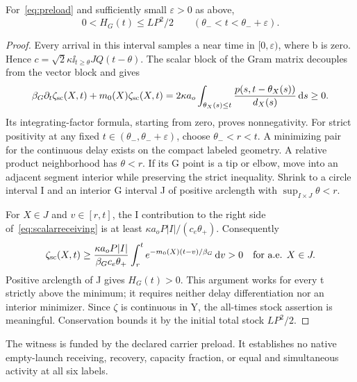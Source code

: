 \begin{proposition}\label{prop:receiving}
For~\eqref{eq:preload} and sufficiently small $\varepsilon>0$ as above,
\begin{equation}\label{eq:strictreceiving}
0<H_G(t)\le LP^2/2\qquad
(\theta_-<t<\theta_-+\varepsilon).
\end{equation}
\end{proposition}
\begin{proof}
Every arrival in this interval samples a near time in $[0,\varepsilon)$, where b is zero. Hence $c=\sqrt2\kappa\ii_{t\ge\theta}JQ(t-\theta)$. The scalar block of the Gram matrix decouples from the vector block and gives
\begin{equation}\label{eq:scalarreceiving}
\beta_G\partial_t\zeta_{\rm sc}(X,t)+m_0(X)\zeta_{\rm sc}(X,t)
=2\kappa a_o\int_{\theta_X(s)\le t}\frac{p(s,t-\theta_X(s))}{d_X(s)}\,\mathrm d s\ge0.
\end{equation}
Its integrating-factor formula, starting from zero, proves nonnegativity. For strict positivity at any fixed $t\in(\theta_-,\theta_-+\varepsilon)$, choose $\theta_-<r<t$. A minimizing pair for the continuous delay exists on the compact labeled geometry. A relative product neighborhood has $\theta<r$. If its G point is a tip or elbow, move into an adjacent segment interior while preserving the strict inequality. Shrink to a circle interval I and an interior G interval J of positive arclength with $\sup_{I\times J}\theta<r$.

For $X\in J$ and $v\in[r,t]$, the I contribution to the right side of~\eqref{eq:scalarreceiving} is at least $\kappa a_oP|I|/(c_e\theta_+)$. Consequently
\begin{equation}\label{eq:strictlower}
\zeta_{\rm sc}(X,t)\ge
\frac{\kappa a_oP|I|}{\beta_Gc_e\theta_+}
\int_r^t e^{-m_0(X)(t-v)/\beta_G}\,\mathrm d v>0
\quad\textnormal{for a.e. }X\in J.
\end{equation}
Positive arclength of J gives $H_G(t)>0$. This argument works for every t strictly above the minimum; it requires neither delay differentiation nor an interior minimizer. Since $\zeta$ is continuous in Y, the all-times stock assertion is meaningful. Conservation bounds it by the initial total stock $LP^2/2$.
\end{proof}
The witness is funded by the declared carrier preload. It establishes no native empty-launch receiving, recovery, capacity fraction, or equal and simultaneous activity at all six labels.

